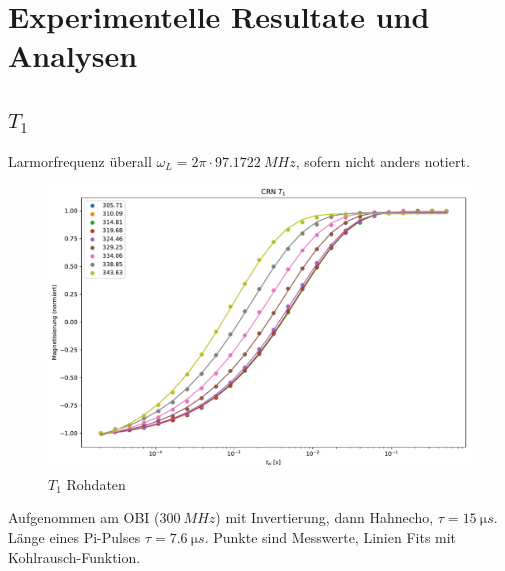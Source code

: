 \chapter{Experimentelle Resultate und Analysen}
\label{chapter:experiment}

\section{$T_1$} \label{section:res:T_1}

Larmorfrequenz überall $\omega_L = 2 \pi \cdot \SI{97.1722}{MHz}$, sofern nicht anders notiert.

\begin{figure}
	\begin{center}
		\includegraphics[width=\textwidth]{graphics/plots/T1/t1_roh.pdf}
	\end{center}
	\caption{$T_1$ Rohdaten} \label{fig:res:T_1_roh}
\end{figure}
Aufgenommen am OBI ($\SI{300}{MHz}$) mit Invertierung, dann Hahnecho, $\tau = \SI{15}{\micro s}$. Länge eines Pi-Pulses $\tau = \SI{7.6}{\micro s}$. Punkte sind Messwerte, Linien Fits mit Kohlrausch-Funktion.

